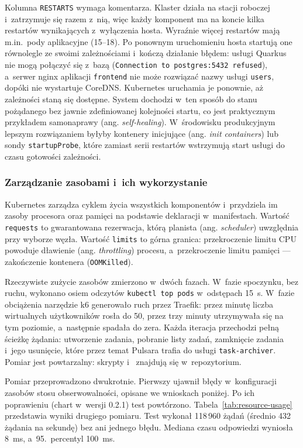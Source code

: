 Kolumna \texttt{RESTARTS} wymaga komentarza. Klaster działa na stacji roboczej i~zatrzymuje się razem z~nią, więc każdy komponent ma na koncie kilka restartów wynikających z~wyłączenia hosta. Wyraźnie więcej restartów mają m.in.\ pody aplikacyjne (15--18). Po ponownym uruchomieniu hosta startują one równolegle ze swoimi zależnościami i~kończą działanie błędem: usługi Quarkus nie mogą połączyć się z~bazą (\texttt{Connection to postgres:5432 refused}), a~serwer nginx aplikacji \texttt{frontend} nie może rozwiązać nazwy usługi \texttt{users}, dopóki nie wystartuje CoreDNS. Kubernetes uruchamia je ponownie, aż zależności staną się dostępne. System dochodzi w~ten sposób do stanu pożądanego bez jawnie zdefiniowanej kolejności startu, co jest praktycznym przykładem samonaprawy (ang. \textit{self-healing}). W~środowisku produkcyjnym lepszym rozwiązaniem byłyby kontenery inicjujące (ang. \textit{init containers}) lub sondy \texttt{startupProbe}, które zamiast serii restartów wstrzymują start usługi do czasu gotowości zależności.

\subsubsection{Zarządzanie zasobami i~ich wykorzystanie}
Kubernetes zarządza cyklem życia wszystkich komponentów i~przydziela im zasoby procesora oraz pamięci na podstawie deklaracji w~manifestach. Wartość \texttt{requests} to gwarantowana rezerwacja, którą planista (ang. \textit{scheduler}) uwzględnia przy wyborze węzła. Wartość \texttt{limits} to górna granica: przekroczenie limitu CPU powoduje dławienie (ang. \textit{throttling}) procesu, a~przekroczenie limitu pamięci --- zakończenie kontenera (\texttt{OOMKilled}).

Rzeczywiste zużycie zasobów zmierzono w~dwóch fazach. W~fazie spoczynku, bez ruchu, wykonano osiem odczytów \texttt{kubectl top pods} w~odstępach 15~s. W~fazie obciążenia narzędzie k6 generowało ruch przez Traefik: przez minutę liczba wirtualnych użytkowników rosła do 50, przez trzy minuty utrzymywała się na tym poziomie, a~następnie spadała do zera. Każda iteracja przechodzi pełną ścieżkę żądania: utworzenie zadania, pobranie listy zadań, zamknięcie zadania i~jego usunięcie, które przez temat Pulsara trafia do usługi \texttt{task-archiver}. Pomiar jest powtarzalny: skrypty  i~ znajdują się w~repozytorium.

Pomiar przeprowadzono dwukrotnie. Pierwszy ujawnił błędy w~konfiguracji zasobów stosu obserwowalności, opisane we wnioskach poniżej. Po ich poprawieniu (chart  w~wersji 0.2.1) test powtórzono. Tabela~\ref{tab:resource-usage} przedstawia wyniki drugiego pomiaru. Test wykonał 118\,960 żądań (średnio 432 żądania na sekundę) bez ani jednego błędu. Mediana czasu odpowiedzi wyniosła 8~ms, a~95.\ percentyl 100~ms.

